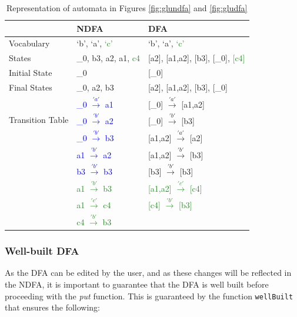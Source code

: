 \begin{table}[H]
  \begin{center}
    \begin{tabular}{ | p{3cm} |p{4cm}||p{4cm}|  }
    \hline
         & NDFA & DFA \\ [1ex]
        \hline
        \hline
        Vocabulary & `b', `a', \textcolor{ForestGreen}{`c'} & `b', `a', \textcolor{ForestGreen}{`c'}\\ [0.7ex]
        \hline
        States & \_0, b3, a2, a1, \textcolor{ForestGreen}{c4} & [a2], [a1,a2], [b3], [\_0], \textcolor{ForestGreen}{[c4]}\\ [0.7ex]
        \hline
        Initial State & \_0 & [\_0] \\ [0.7ex]
        \hline
        Final States & \_0, a2, b3 & [a2], [a1,a2], [b3], [\_0] \\ [0.7ex]
        \hline
        \multirow{3}{5em}{Transition Table} & \textcolor{blue}{\_0 $\xrightarrow{'a'}$ a1} & [\_0] $\xrightarrow{'a'}$ [a1,a2]\\
        & \textcolor{blue}{\_0 $\xrightarrow{'b'}$ a2} & [\_0]    $\xrightarrow{'b'}$ [b3]\\
        & \textcolor{blue}{\_0 $\xrightarrow{'b'}$ b3} & [a1,a2]  $\xrightarrow{'a'}$ [a2]\\
        & \textcolor{blue}{a1  $\xrightarrow{'b'}$ a2} & [a1,a2]  $\xrightarrow{'b'}$ [b3]\\
        & \textcolor{blue}{b3  $\xrightarrow{'b'}$ b3} & [b3]     $\xrightarrow{'b'}$ [b3]\\
        & \textcolor{ForestGreen}{a1  $\xrightarrow{'b'}$ b3} & \textcolor{ForestGreen}{[a1,a2]  $\xrightarrow{'c'}$ [c4]}\\
        & \textcolor{ForestGreen}{a1  $\xrightarrow{'c'}$ c4} & \textcolor{ForestGreen}{[c4]  $\xrightarrow{'b'}$ [b3]}\\
        & \textcolor{ForestGreen}{c4  $\xrightarrow{'b'}$ b3} & \\
        \hline
        \end{tabular}
  \end{center}
  \caption{Representation of automata in Figures \ref{fig:glundfa} and \ref{fig:gludfa}}
  \label{sourceUpdated}
\end{table}

\subsubsection{Well-built DFA}
As the DFA can be edited by the user, and as these changes will be reflected in the NDFA, it is important to guarantee that the DFA is well built before proceeding with the \textit{put} function. This is guaranteed by the function \texttt{wellBuilt} that ensures the following:

